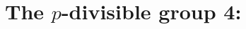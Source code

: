 \section[The p-divisible group 4: ]{The $p$-divisible group 4: }








































